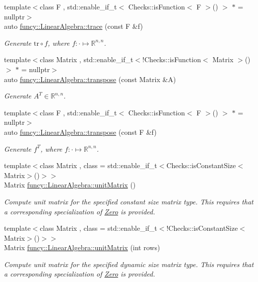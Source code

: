 \begin{DoxyCompactItemize}
{\footnotesize template$<$class F , std\-::enable\-\_\-if\-\_\-t$<$ Checks\-::is\-Function$<$ F $>$() $>$ $\ast$  = nullptr$>$ }\\auto \hyperlink{group__LinearAlgebraGroup_ga16931a1c71fa12799e8275c404387fba}{funcy\-::\-Linear\-Algebra\-::trace} (const F \&f)
\begin{DoxyCompactList}\small\item\em Generate $\mathrm{tr}\circ f$, where $f:\cdot\mapsto\mathbb{R}^{n,n} $. \end{DoxyCompactList}\item 
{\footnotesize template$<$class Matrix , std\-::enable\-\_\-if\-\_\-t$<$!\-Checks\-::is\-Function$<$ Matrix $>$()$>$ $\ast$  = nullptr$>$ }\\auto \hyperlink{group__LinearAlgebraGroup_gac2512740d1417713c297b71420212f09}{funcy\-::\-Linear\-Algebra\-::transpose} (const Matrix \&A)
\begin{DoxyCompactList}\small\item\em Generate $A^T\in\mathbb{R}^{n,n}$. \end{DoxyCompactList}\item 
{\footnotesize template$<$class F , std\-::enable\-\_\-if\-\_\-t$<$ Checks\-::is\-Function$<$ F $>$() $>$ $\ast$  = nullptr$>$ }\\auto \hyperlink{group__LinearAlgebraGroup_ga6e5faa927c52ea1963be57e501ebdc6c}{funcy\-::\-Linear\-Algebra\-::transpose} (const F \&f)
\begin{DoxyCompactList}\small\item\em Generate $f^T$, where $f:\cdot\mapsto\mathbb{R}^{n,n} $. \end{DoxyCompactList}\item 
{\footnotesize template$<$class Matrix , class  = std\-::enable\-\_\-if\-\_\-t$<$\-Checks\-::is\-Constant\-Size$<$\-Matrix$>$()$>$$>$ }\\Matrix \hyperlink{group__LinearAlgebraGroup_ga04d388790cbcaac909faeb3b930c7ae7}{funcy\-::\-Linear\-Algebra\-::unit\-Matrix} ()
\begin{DoxyCompactList}\small\item\em Compute unit matrix for the specified constant size matrix type. This requires that a corresponding specialization of \hyperlink{structfuncy_1_1Zero}{Zero} is provided. \end{DoxyCompactList}\item 
{\footnotesize template$<$class Matrix , class  = std\-::enable\-\_\-if\-\_\-t$<$!\-Checks\-::is\-Constant\-Size$<$\-Matrix$>$()$>$$>$ }\\Matrix \hyperlink{group__LinearAlgebraGroup_gab4a999f99c90ece2b9319d28c213ed58}{funcy\-::\-Linear\-Algebra\-::unit\-Matrix} (int rows)
\begin{DoxyCompactList}\small\item\em Compute unit matrix for the specified dynamic size matrix type. This requires that a corresponding specialization of \hyperlink{structfuncy_1_1Zero}{Zero} is provided. \end{DoxyCompactList}\end{DoxyCompactItemize}


